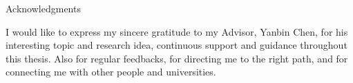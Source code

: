 \thispagestyle{empty}

\vspace*{20mm}

\begin{center}
    { Acknowledgments}
\end{center}

\vspace{10mm}

I would like to express my sincere gratitude to my Advisor, Yanbin Chen, for his interesting topic and research idea, continuous support and guidance throughout this thesis.
Also for regular feedbacks, for directing me to the right path, and for connecting me with other people and universities.

\cleardoublepage{}
